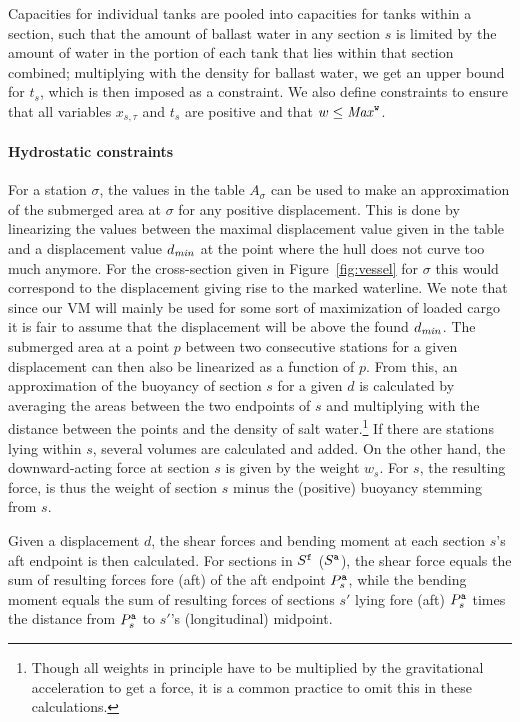 Capacities for individual tanks are pooled into capacities for tanks within a section, such that the amount of ballast water in any section $s$ is limited by the amount of water in the portion of each tank that lies within that section combined; multiplying with the density for ballast water, we get an upper bound for $t_s$, which is then imposed as a constraint.
We also define constraints to ensure that all variables $x_{s,\tau}$ and $t_s$ are positive and that $w\leq\mathit{Max}^{\texttt{w}}$. 

\paragraph{Hydrostatic constraints}
For a station $\sigma$, the values in the table $A_{\sigma}$ can be used to make an approximation of the submerged area at $\sigma$ for any positive displacement. This is done by linearizing the values between the maximal displacement value given in the table and a displacement value $d_\mathit{min}$ at the point where the hull does not curve too much anymore. For the cross-section given in Figure~\ref{fig:vessel} for $\sigma$ this would correspond to the displacement giving rise to the marked waterline.
We note that since our VM will mainly be used for some sort of maximization of loaded cargo it is fair to assume that the displacement will be above the found $d_\mathit{min}$.
The submerged area at a point $p$ between two consecutive stations for a given displacement can then also be linearized as a function of $p$. 
From this, an approximation of the buoyancy of section $s$ for a given $d$ is calculated by averaging the areas between the two endpoints of $s$ and multiplying with the distance between the points and the density of salt water.\footnote{Though all weights in principle have to be multiplied by the gravitational acceleration to get a force, it is a common practice to omit this in these calculations.} If there are stations lying within $s$, several volumes are calculated and added.
On the other hand, the downward-acting force at section $s$ is given by the weight $w_s$. For $s$, the resulting force, is thus the weight of section $s$ minus the (positive) buoyancy stemming from $s$.  
  
Given a displacement $d$, the shear forces and bending moment at each section $s$'s aft endpoint is then calculated. For sections in $S^{\texttt{f}}$ ($S^{\texttt{a}}$), the shear force  equals the sum of resulting forces fore (aft) of the aft endpoint $P^{\texttt{a}}_s$, while the bending moment equals the sum of resulting forces of sections $s'$ lying fore (aft) $P^{\texttt{a}}_s$ times the distance from $P^{\texttt{a}}_s$ to $s'$'s (longitudinal) midpoint.

